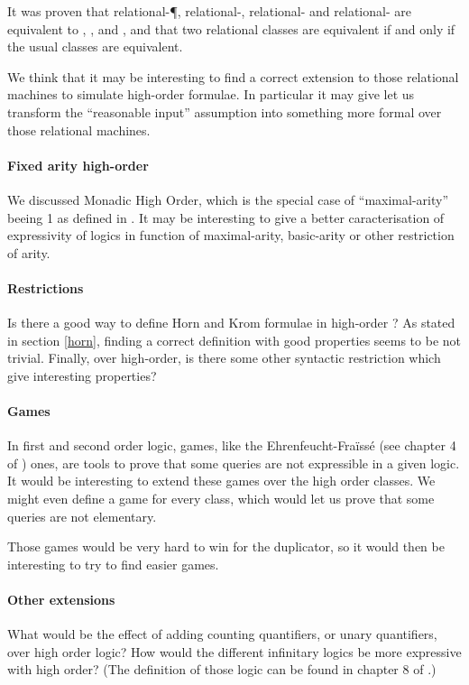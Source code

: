 \documentclass[a4paper,12pt]{article}
\theoremstyle{definition}
\begin{document}
It was proven that relational-\P, relational-\NP{}, relational-\PSPACE{}
and relational-\EXP{} are equivalent to , ,
 and , and that two relational classes are
equivalent if and only if the usual classes are equivalent.

We think that it may be interesting to find a correct extension to
those relational machines to simulate high-order formulae. In
particular it may give let us transform the ``reasonable input''
assumption into something more formal over those relational machines.

\paragraph{Fixed arity high-order}
We discussed Monadic High Order, which is the special case of
``maximal-arity'' beeing 1 as defined in \cite{arity}. It may be
interesting to give a better caracterisation of expressivity of logics
in function of maximal-arity, basic-arity \cite{kolo} or other
restriction of arity.

\paragraph{Restrictions}Is there a good way to define Horn and Krom
formulae in high-order ? As stated in section \ref{horn}, finding a
correct definition with good properties seems to be not trivial. 
Finally, over high-order, is there some other syntactic restriction
which give interesting properties?

\paragraph{Games}
In first and second order logic, games, like the Ehrenfeucht-Fraïssé
(see chapter 4 of \cite{libkin}) ones, are tools to prove that some
queries are not expressible in a given logic. It would be interesting
to extend these games over the high order classes.  We might even define a game
for every class, which would let us prove that some queries are not
elementary.

Those games would be very hard to win for the duplicator, so it would
then be interesting to try to find easier games.

\paragraph{Other extensions}
What would be the effect of adding counting quantifiers, or unary
quantifiers, over high order logic? How would the different
infinitary logics be more expressive with high order? (The definition
of those logic can be found in chapter 8 of \cite{libkin}.)
\end{document}
